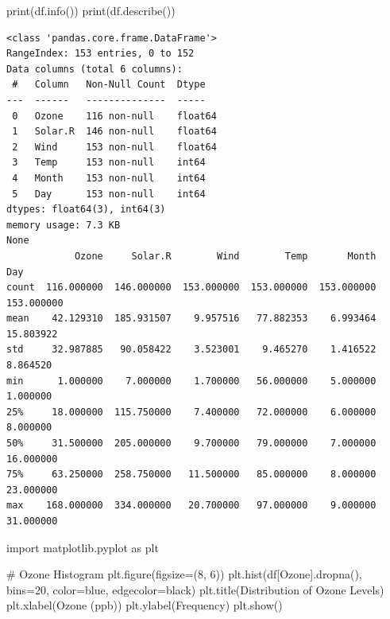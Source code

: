 \documentclass[
  letterpaper,
  DIV=11,
  numbers=noendperiod]{scrreprt}
\newenvironment{Shaded}{\begin{snugshade}}{\end{snugshade}}
\newcommand{\BuiltInTok}[1]{\textcolor[rgb]{0.00,0.23,0.31}{#1}}
\newcommand{\CommentTok}[1]{\textcolor[rgb]{0.37,0.37,0.37}{#1}}
\newcommand{\DecValTok}[1]{\textcolor[rgb]{0.68,0.00,0.00}{#1}}
\newcommand{\ImportTok}[1]{\textcolor[rgb]{0.00,0.46,0.62}{#1}}
\newcommand{\NormalTok}[1]{\textcolor[rgb]{0.00,0.23,0.31}{#1}}
\newcommand{\OperatorTok}[1]{\textcolor[rgb]{0.37,0.37,0.37}{#1}}
\newcommand{\StringTok}[1]{\textcolor[rgb]{0.13,0.47,0.30}{#1}}
\begin{document}
\begin{Shaded}
\begin{Highlighting}[]
\BuiltInTok{print}\NormalTok{(df.info())}
\BuiltInTok{print}\NormalTok{(df.describe())}
\end{Highlighting}
\end{Shaded}

\begin{verbatim}
<class 'pandas.core.frame.DataFrame'>
RangeIndex: 153 entries, 0 to 152
Data columns (total 6 columns):
 #   Column   Non-Null Count  Dtype  
---  ------   --------------  -----  
 0   Ozone    116 non-null    float64
 1   Solar.R  146 non-null    float64
 2   Wind     153 non-null    float64
 3   Temp     153 non-null    int64  
 4   Month    153 non-null    int64  
 5   Day      153 non-null    int64  
dtypes: float64(3), int64(3)
memory usage: 7.3 KB
None
            Ozone     Solar.R        Wind        Temp       Month         Day
count  116.000000  146.000000  153.000000  153.000000  153.000000  153.000000
mean    42.129310  185.931507    9.957516   77.882353    6.993464   15.803922
std     32.987885   90.058422    3.523001    9.465270    1.416522    8.864520
min      1.000000    7.000000    1.700000   56.000000    5.000000    1.000000
25%     18.000000  115.750000    7.400000   72.000000    6.000000    8.000000
50%     31.500000  205.000000    9.700000   79.000000    7.000000   16.000000
75%     63.250000  258.750000   11.500000   85.000000    8.000000   23.000000
max    168.000000  334.000000   20.700000   97.000000    9.000000   31.000000
\end{verbatim}

\begin{Shaded}
\begin{Highlighting}[]
\ImportTok{import}\NormalTok{ matplotlib.pyplot }\ImportTok{as}\NormalTok{ plt}

\CommentTok{\# Ozone Histogram}
\NormalTok{plt.figure(figsize}\OperatorTok{=}\NormalTok{(}\DecValTok{8}\NormalTok{, }\DecValTok{6}\NormalTok{))}
\NormalTok{plt.hist(df[}\StringTok{\textquotesingle{}Ozone\textquotesingle{}}\NormalTok{].dropna(), bins}\OperatorTok{=}\DecValTok{20}\NormalTok{, color}\OperatorTok{=}\StringTok{\textquotesingle{}blue\textquotesingle{}}\NormalTok{, edgecolor}\OperatorTok{=}\StringTok{\textquotesingle{}black\textquotesingle{}}\NormalTok{)}
\NormalTok{plt.title(}\StringTok{\textquotesingle{}Distribution of Ozone Levels\textquotesingle{}}\NormalTok{)}
\NormalTok{plt.xlabel(}\StringTok{\textquotesingle{}Ozone (ppb)\textquotesingle{}}\NormalTok{)}
\NormalTok{plt.ylabel(}\StringTok{\textquotesingle{}Frequency\textquotesingle{}}\NormalTok{)}
\NormalTok{plt.show()}

\end{Highlighting}
\end{Shaded}
\end{document}
